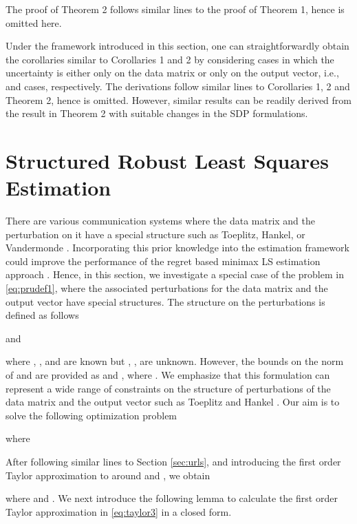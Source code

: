 \documentclass[review,sort&compress]{elsarticle}
\begin{document}
\begin{pot2}
The proof of Theorem 2 follows similar lines to the proof of Theorem 1, hence is omitted here. \hfill 
\end{pot2}

\begin{rmk}
Under the framework introduced in this section, one can straightforwardly obtain the corollaries similar to Corollaries 1 and 2 by considering cases in which the uncertainty is either only on the data matrix or only on the output vector, i.e.,  and  cases, respectively. The derivations follow similar lines to Corollaries 1, 2 and Theorem 2, hence is omitted. However, similar results can be readily derived from the result in Theorem 2 with suitable changes in the SDP formulations.
\end{rmk}

\section{Structured Robust Least Squares Estimation}\label{sec:srls}
There are various communication systems where the data matrix and the perturbation on it have a special structure such as Toeplitz, Hankel, or Vandermonde \cite{est1, tls}. Incorporating this prior knowledge into the estimation framework could improve the performance of the regret based minimax LS estimation approach \cite{est1, tls}. Hence, in this section, we investigate a special case of the problem in \eqref{eq:prudef1}, where the associated perturbations for the data matrix  and the output vector  have special structures. The structure on the perturbations is defined as follows

and

where , , and  are known but , , are unknown. However, the bounds on the norm of  and  are provided as  and , where . We emphasize that this formulation can represent a wide range of constraints on the structure of perturbations of the data matrix and the output vector such as Toeplitz and Hankel \cite{est1, sayedbook}. Our aim is to solve the following optimization problem

where


After following similar lines to Section \ref{sec:urls}, and introducing the first order Taylor approximation to  around  and , we obtain

where  and . We next introduce the following lemma to calculate the first order Taylor approximation in \eqref{eq:taylor3} in a closed form.
\end{document}
